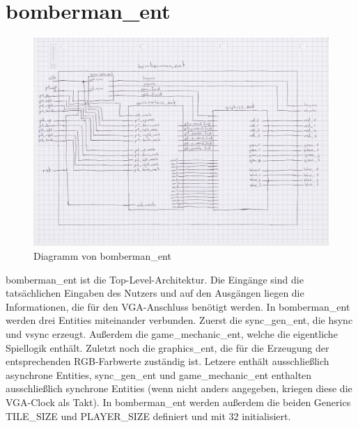 \documentclass[parskip=full]{scrartcl}
\begin{document}
		\section{bomberman\_ent}
			\begin{figure}[H]
				\centering
				\includegraphics[scale=0.1]{./bilder/bombermanEnt.jpeg}
				\caption{Diagramm von bomberman\_ent}
			\end{figure}
			bomberman\_ent ist die Top-Level-Architektur. Die Eingänge sind die tatsächlichen Eingaben des Nutzers und auf den Ausgängen liegen die Informationen, die für den VGA-Anschluss benötigt werden. In bomberman\_ent werden drei Entities miteinander verbunden. Zuerst die sync\_gen\_ent, die hsync und vsync erzeugt. Außerdem die game\_mechanic\_ent, welche die eigentliche Spiellogik enthält. Zuletzt noch die graphics\_ent, die für die Erzeugung der entsprechenden RGB-Farbwerte zuständig ist. 
			Letzere enthält ausschließlich asynchrone Entities, sync\_gen\_ent und game\_mechanic\_ent enthalten ausschließlich synchrone Entities (wenn nicht anders angegeben, kriegen diese die VGA-Clock als Takt).
			In bomberman\_ent werden außerdem die beiden Generics TILE\_SIZE und PLAYER\_SIZE definiert und mit 32 initialisiert.
		
\end{document}
